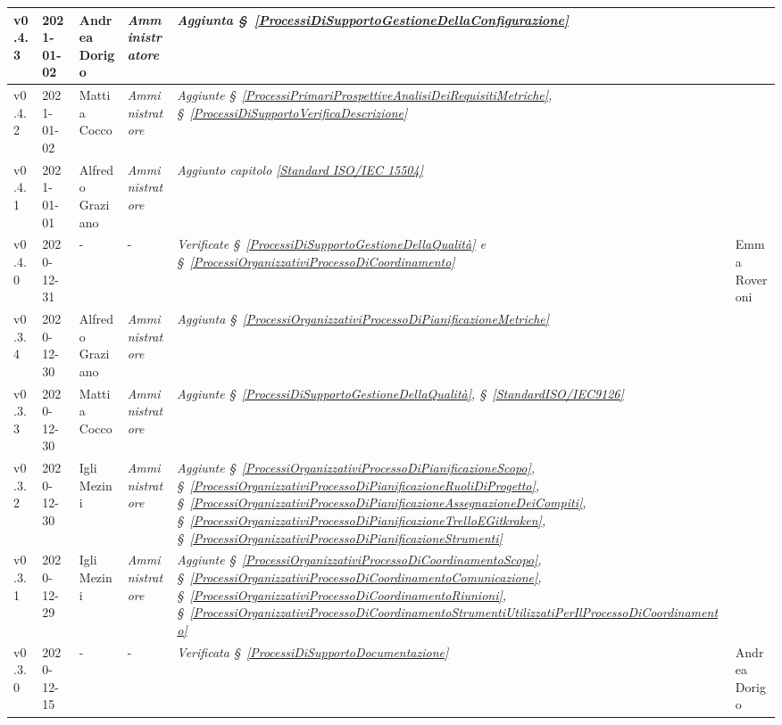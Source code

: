 {\begin{center}
\begin{longtable}[c]{|p{2cm-1\tabcolsep}|p{2cm}|p{3cm-2\tabcolsep}|p{3cm-1.5\tabcolsep}|p{}|p{3cm-2\tabcolsep}|}
		\hline
		\centering v0.4.3 & 2021-01-02 & Andrea Dorigo & \centering \textit{Amministratore}  & \textit{Aggiunta  \S~\ref{ProcessiDiSupportoGestioneDellaConfigurazione}} & \makecell[c]{-}\\
		\hline
		\centering v0.4.2 & 2021-01-02 & Mattia Cocco & \centering \textit{Amministratore}  & \textit{Aggiunte  \S~\ref{ProcessiPrimariProspettiveAnalisiDeiRequisitiMetriche}, \S~\ref{ProcessiDiSupportoVerificaDescrizione}}  & \makecell[c]{-}\\
		\hline
		\centering v0.4.1 & 2021-01-01 & Alfredo Graziano & \centering \textit{Amministratore}  & \textit{Aggiunto capitolo \ref{Standard ISO/IEC 15504}} &\makecell[c]{-} \\
		\hline
		\centering v0.4.0 & 2020-12-31 & \centering - & \centering -  & \textit{Verificate  \S~\ref{ProcessiDiSupportoGestioneDellaQualità} e \S~\ref{ProcessiOrganizzativiProcessoDiCoordinamento} } & Emma Roveroni \\
		\hline
		\centering v0.3.4 & 2020-12-30 & Alfredo Graziano & \centering \textit{Amministratore} &  \textit{Aggiunta  \S~\ref{ProcessiOrganizzativiProcessoDiPianificazioneMetriche}} & \makecell[c]{-} \\
		\hline
		\centering v0.3.3 & 2020-12-30 & Mattia Cocco & \centering \textit{Amministratore}  & \textit{Aggiunte  \S~\ref{ProcessiDiSupportoGestioneDellaQualità}, \S~\ref{StandardISO/IEC9126} }  & \makecell[c]{-}\\
		\hline
		\centering v0.3.2 & 2020-12-30 & Igli Mezini & \centering \textit{Amministratore}  & \textit{Aggiunte  \S~\ref{ProcessiOrganizzativiProcessoDiPianificazioneScopo}, \S~\ref{ProcessiOrganizzativiProcessoDiPianificazioneRuoliDiProgetto}, \S~\ref{ProcessiOrganizzativiProcessoDiPianificazioneAssegnazioneDeiCompiti}, \S~\ref{ProcessiOrganizzativiProcessoDiPianificazioneTrelloEGitkraken}, \S~\ref{ProcessiOrganizzativiProcessoDiPianificazioneStrumenti} } & \makecell[c]{-} \\
		\hline
		\centering v0.3.1 & 2020-12-29 & Igli Mezini & \centering \textit{Amministratore} &  \textit{Aggiunte  \S~\ref{ProcessiOrganizzativiProcessoDiCoordinamentoScopo}, \S~\ref{ProcessiOrganizzativiProcessoDiCoordinamentoComunicazione}, \S~\ref{ProcessiOrganizzativiProcessoDiCoordinamentoRiunioni}, \S~\ref{ProcessiOrganizzativiProcessoDiCoordinamentoStrumentiUtilizzatiPerIlProcessoDiCoordinamento} } & \makecell[c]{-} \\
		\hline
		\centering v0.3.0 & 2020-12-15 & \centering - & \centering -  & 
		\textit{Verificata  \S~\ref{ProcessiDiSupportoDocumentazione}} & Andrea Dorigo \\

\end{longtable}
\end{center}}

